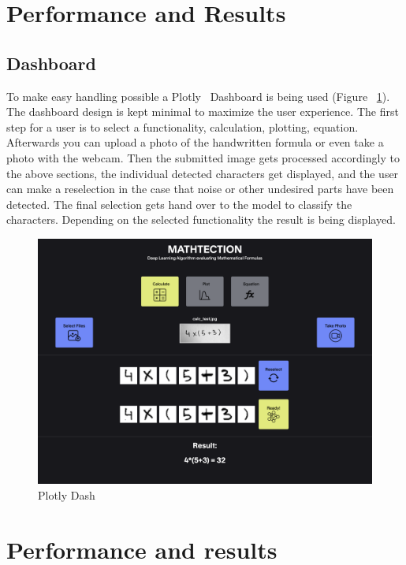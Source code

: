 \documentclass[@CLASSOPTIONS@]{tumarticle}
\begin{document}
\section{Performance and Results}
\label{sec:customization}

\subsection{Dashboard}

To make easy handling possible a Plotly~\cite{plotly} Dashboard is being used (Figure ~\ref{Fig:Dash}).
The dashboard design is kept minimal to maximize the user experience.
The first step for a user is to select a functionality,
calculation, plotting, equation.
Afterwards you can upload a photo of the handwritten formula or even take a photo
with the webcam.
Then the submitted image gets processed accordingly to the above sections,
the individual detected characters get displayed, and the user can make a reselection
in the case that noise or other undesired parts have been detected.
The final selection gets hand over to the model to classify the characters.
Depending on the selected functionality the result is being displayed.

\begin{figure}
    \begin{minipage}{0.48\textwidth}
     \centering
     \includegraphics[width=.9\linewidth]{figures/dash}
     \caption{Plotly Dash}\label{Fig:Dash}
   \end{minipage}
\end{figure}

\section{Performance and results}
\end{document}
